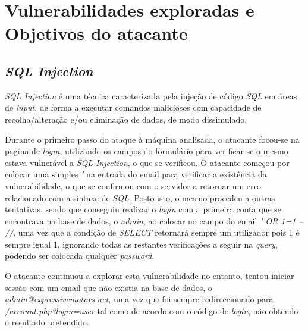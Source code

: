 \documentclass[10pt,english]{article}
\begin{document}
\clearpage


\section{Vulnerabilidades exploradas e Objetivos do atacante}

\subsection{\textit{SQL Injection}}

\par \textit{SQL Injection} é uma técnica caracterizada pela injeção de código \textit{SQL} em áreas de \textit{input}, de forma a executar comandos maliciosos com capacidade de recolha/alteração e/ou eliminação de dados, de modo dissimulado.

\par Durante o primeiro passo do ataque à máquina analisada, o atacante focou-se na página de \textit{login}, utilizando os campos do formulário para verificar se o mesmo estava vulnerável a \textit{SQL Injection}, o que se verificou. O atacante começou por colocar uma simples \textit{'} na entrada do email para verificar a existência da vulnerabilidade, o que se confirmou com o servidor a retornar um erro relacionado com a sintaxe de \textit{SQL}. Posto isto, o mesmo procedeu a outras tentativas, sendo que conseguiu realizar o \textit{login} com a primeira conta que se encontrava na base de dados, o \textit{admin}, ao colocar no campo do email \textit{' OR 1=1 -- //}, uma vez que a condição de \textit{SELECT} retornará sempre um utilizador pois 1 é sempre igual 1, ignorando todas as restantes verificações a seguir na \textit{query}, podendo ser colocada qualquer \textit{password}.

\par O atacante continuou a explorar esta vulnerabilidade no entanto, tentou iniciar sessão com um email que não existia na base de dados, o \textit{admin@expressivemotors.net}, uma vez que foi sempre redireccionado para \textit{/account.php?login=user} tal como de acordo com o código de \textit{login}, não obtendo o resultado pretendido.
\end{document}
